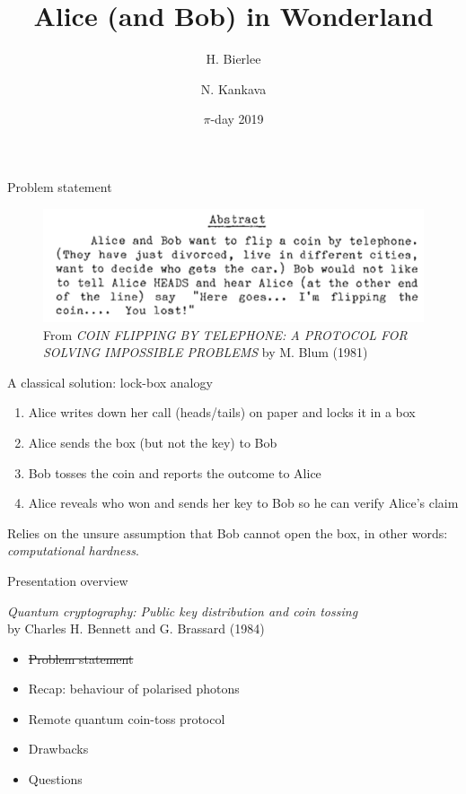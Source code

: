 \documentclass{beamer}
\title{Alice (and Bob) in Wonderland}
\author{H. Bierlee \and N. Kankava}
\institute{Uppsala University}
\date{$\pi$-day 2019}
\begin{document}
 
\frame{\titlepage}
 
\begin{frame}{Problem statement}

\begin{figure}
    \centering
    \includegraphics{blum-abstract}
    \caption{From \emph{COIN FLIPPING BY TELEPHONE: A PROTOCOL FOR SOLVING IMPOSSIBLE PROBLEMS} by M. Blum (1981)}
    \label{fig:blum-abstract}
\end{figure}

\end{frame}

\begin{frame}{A classical solution: lock-box analogy}

\begin{enumerate}
    \item Alice writes down her call (heads/tails) on paper and locks it in a box
    \item Alice sends the box (but not the key) to Bob
    \item Bob tosses the coin and reports the outcome to Alice
    \item Alice reveals who won and sends her key to Bob so he can verify Alice's claim
\end{enumerate}

Relies on the unsure assumption that Bob cannot open the box, in other words: \emph{computational hardness}.

\end{frame}

\begin{frame}{Presentation overview}

\emph{Quantum cryptography:
Public key distribution and coin tossing}\\
\quad by Charles H. Bennett and G. Brassard (1984)
\vfill

\begin{itemize}
    \item \sout{Problem statement}
    \vfill
    \item Recap: behaviour of polarised photons
    \vfill
    \item Remote quantum coin-toss protocol
    \vfill
    \item Drawbacks
    \vfill
    \item Questions
    \vfill
\end{itemize}
\vfill

\end{frame}
\end{document}
